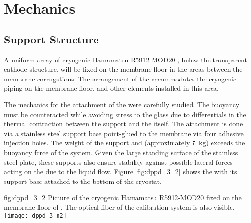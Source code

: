 \section{Mechanics}
\label{sec:dp-pds-mechanics}

\subsection{ Support Structure}
\label{subsec:dp-pds-mechanics-pmtsupport}

A uniform array of \dpnumpmtch cryogenic Hamamatsu R5912-MOD20 , below the transparent cathode structure, will be fixed on the membrane floor in the areas between the membrane corrugations. The arrangement of the  accommodates the cryogenic piping on the membrane floor, and other elements installed in this area.

The mechanics for the attachment of the  were carefully studied. The  buoyancy must be counteracted while avoiding stress to the  glass due to differentials in the thermal contraction between the support and the  itself. The attachment is done via a stainless steel support base point-glued to the membrane via four adhesive injection holes. The weight of the support and  (approximately \SI{7}{\kg}) exceeds the buoyancy force of the system. Given the large standing surface of the stainless steel plate, these supports also ensure stability against possible lateral forces acting on the  due to the liquid flow. Figure \ref{fig:dppd_3_2} shows the  with its support base attached to the bottom of the  cryostat.


\begin{dunefigure}{fig:dppd_3_2}
{Picture of the cryogenic Hamamatsu R5912-MOD20  fixed on the membrane floor of . The optical fiber of the calibration system is also visible.}
\texttt{[image: dppd\_3\_n2]}
\end{dunefigure}



